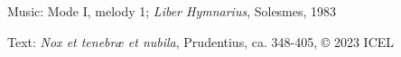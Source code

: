 




\begin{hymnsource}
Music: Mode I, melody 1; \emph{Liber Hymnarius}, Solesmes, 1983

Text: \emph{Nox et tenebræ et nubila}, Prudentius, ca. 348-405, © 2023 ICEL
\end{hymnsource}
